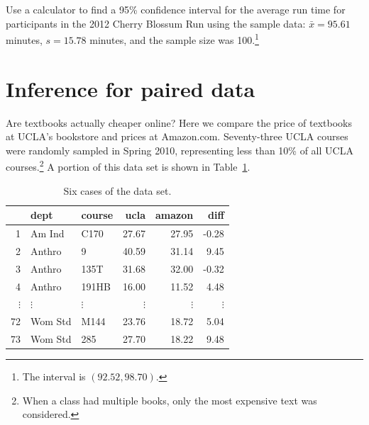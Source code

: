 \begin{exercise}
Use a calculator to find a 95\% confidence interval for the average run time for participants in the 2012 Cherry Blossum Run using the sample data: $\bar{x} = 95.61$ minutes, $s = 15.78$ minutes, and the sample size was 100.\footnote{The interval is $(92.52, 98.70)$.}
\end{exercise}



\textA{\newpage}

\section[Inference for paired data]{Inference for paired data  }

\label{pairedData}



Are textbooks actually cheaper online? Here we compare the price of textbooks at UCLA's bookstore and prices at Amazon.com. Seventy-three UCLA courses were randomly sampled in Spring 2010, representing less than 10\% of all UCLA courses.\footnote{When a class had multiple books, only the most expensive text was considered.} A portion of this data set is shown in Table~\ref{textbooksDF}.

\begin{table}[h]
\centering
\begin{tabular}{rllrrr}
  \hline
 & dept & course & ucla & amazon & diff \\
  \hline
1 & Am Ind &  C170 & 27.67 & 27.95 & -0.28 \\
  2 & Anthro & 9 & 40.59 & 31.14 & 9.45 \\
  3 & Anthro & 135T & 31.68 & 32.00 & -0.32 \\
  4 & Anthro & 191HB & 16.00 & 11.52 & 4.48 \\
$\vdots$ & $\vdots$ & $\vdots$ & $\vdots$ & $\vdots$ & $\vdots$ \\
  72 & Wom Std & M144 & 23.76 & 18.72 & 5.04 \\
  73 & Wom Std & 285 & 27.70 & 18.22 & 9.48 \\
   \hline
\end{tabular}
\caption{Six cases of the  data set.}
\label{textbooksDF}
\end{table}

